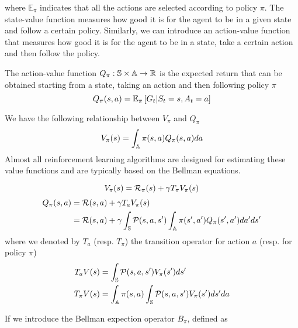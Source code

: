 where $\mathbb{E}_{\pi}$ indicates that all the actions are selected according
to policy $\pi$. The state-value function measures how good it is for the agent
to be in a given state and follow a certain policy. Similarly, we can introduce
an action-value function that measures how good it is for the agent to be in a 
state, take a certain action and then follow the policy. 
\begin{definition}
	The action-value function $Q_\pi: \S \times \A \to \R$ is the expected 
	return that can be obtained starting from a state, taking an action and
	then following policy $\pi$
	\begin{equation}
		Q_\pi(s,a) = \E[\pi]{G_t|S_t = s, A_t = a}
	\end{equation}
\end{definition}
We have the following relationship between $V_\pi$ and $Q_\pi$
\begin{equation}
	V_\pi(s) = \int_\A \pi(s,a) Q_\pi(s,a) da
\end{equation}
Almost all reinforcement learning algorithms are designed for estimating these 
value functions and are typically based on the Bellman equations.
\begin{proposition}
	\begin{equation}
		V_\pi(s) = \calR_\pi(s) + \gamma T_\pi V_\pi(s)	
		\label{eq:bellman_expectation_eq_V}
	\end{equation}
	\begin{equation}
		\begin{split}
			Q_\pi(s,a) &= \calR(s,a) + \gamma T_a V_\pi(s)\\
					   &= \calR(s,a) + \gamma \int_\S \calP(s,a,s') \int_\A
			\pi(s',a') Q_\pi(s', a') da' ds'
			\label{eq:bellman_expectation_eq_Q}
		\end{split}
	\end{equation}
	where we denoted by $T_a$ (resp. $T_\pi$) the transition operator for action 
	$a$ (resp. for policy $\pi$)
	\begin{equation}
		\begin{split}
			T_a V(s) &= \int_\S \calP(s, a, s') V_\pi(s') ds'\\
			T_\pi V(s) &= \int_\A \pi(s,a) \int_\S \calP(s,a,s') V_\pi(s') ds'
			da\\ 
		\end{split}
	\end{equation}
\end{proposition}
If we introduce the Bellman expection operator $B_\pi$, defined as 
